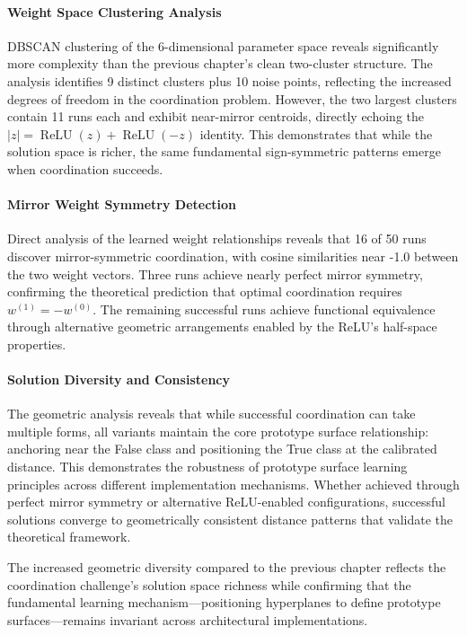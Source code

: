 \paragraph{Weight Space Clustering Analysis}
DBSCAN clustering of the 6-dimensional parameter space reveals significantly more complexity than the previous chapter's clean two-cluster structure. The analysis identifies 9 distinct clusters plus 10 noise points, reflecting the increased degrees of freedom in the coordination problem. However, the two largest clusters contain 11 runs each and exhibit near-mirror centroids, directly echoing the $|z| = \operatorname{ReLU}(z) + \operatorname{ReLU}(-z)$ identity. This demonstrates that while the solution space is richer, the same fundamental sign-symmetric patterns emerge when coordination succeeds.

\paragraph{Mirror Weight Symmetry Detection}
Direct analysis of the learned weight relationships reveals that 16 of 50 runs discover mirror-symmetric coordination, with cosine similarities near -1.0 between the two weight vectors. Three runs achieve nearly perfect mirror symmetry, confirming the theoretical prediction that optimal coordination requires $w^{(1)} = -w^{(0)}$. The remaining successful runs achieve functional equivalence through alternative geometric arrangements enabled by the ReLU's half-space properties.

\paragraph{Solution Diversity and Consistency}
The geometric analysis reveals that while successful coordination can take multiple forms, all variants maintain the core prototype surface relationship: anchoring near the False class and positioning the True class at the calibrated distance. This demonstrates the robustness of prototype surface learning principles across different implementation mechanisms. Whether achieved through perfect mirror symmetry or alternative ReLU-enabled configurations, successful solutions converge to geometrically consistent distance patterns that validate the theoretical framework.

The increased geometric diversity compared to the previous chapter reflects the coordination challenge's solution space richness while confirming that the fundamental learning mechanism—positioning hyperplanes to define prototype surfaces—remains invariant across architectural implementations.

